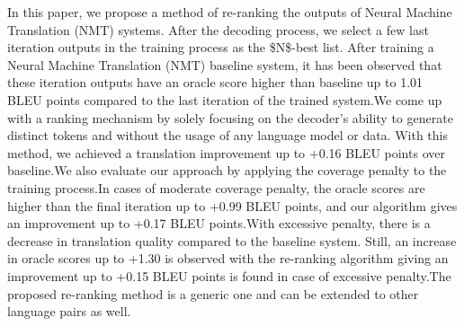 In this paper, we propose a method of re-ranking the outputs of Neural Machine Translation (NMT) systems. After the decoding process, we select a few last iteration outputs in the training process as the \$N\$-best list. After training a Neural Machine Translation (NMT) baseline system, it has been observed that these iteration outputs have an oracle score higher than baseline up to 1.01 BLEU points compared to the last iteration of the trained system.We come up with a ranking mechanism by solely focusing on the decoder's ability to generate distinct tokens and without the usage of any language model or data. With this method, we achieved a translation improvement up to +0.16 BLEU points over baseline.We also evaluate our approach by applying the coverage penalty to the training process.In cases of moderate coverage penalty, the oracle scores are higher than the final iteration up to +0.99 BLEU points, and our algorithm gives an improvement up to +0.17 BLEU points.With excessive penalty, there is a decrease in translation quality compared to the baseline system. Still, an increase in oracle scores up to +1.30 is observed with the re-ranking algorithm giving an improvement up to +0.15 BLEU points is found in case of excessive penalty.The proposed re-ranking method is a generic one and can be extended to other language pairs as well.
